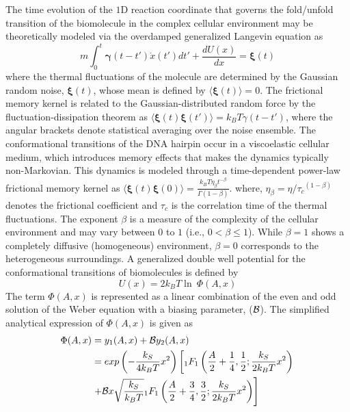 \documentclass[twoside,twocolumn,9pt]{article}
\begin{document}
The time evolution of the $1$D reaction coordinate that governs the fold/unfold transition of the biomolecule 
in the complex cellular environment may be theoretically modeled via the overdamped generalized Langevin equation
as \cite{zwanzig2001nonequilibrium,kubo2012statistical,sharma2021effect,sharma2020conformational,sharma2022analysis}
\begin{equation}
m \int_{0}^{t}\mathbf{\gamma}{(t-t')}{\dot{{{x}}}{(t')}} dt' + \frac{d {U}{(x)}}{dx} = \mathbf{\xi}{(t)}
\label{GLE}
\end{equation} 
where the thermal fluctuations of the molecule are determined by the Gaussian random noise, $\mathbf{\xi}{(t)}$,
whose mean is defined by $\langle\mathbf{\xi}{(t)}\rangle=0$. The frictional memory kernel is related to the 
Gaussian-distributed random force by the fluctuation-dissipation theorem \cite{kubo2012statistical} as 
$\langle\mathbf{\xi}{(t)}\mathbf{\xi}{(t')}\rangle=k_{B}T\gamma(t-t')$, where the angular brackets denote statistical
averaging over the noise ensemble. The conformational transitions of the DNA hairpin occur in a viscoelastic cellular 
medium, which introduces memory effects that makes the dynamics typically non-Markovian. This dynamics is modeled 
through a time-dependent power-law frictional memory kernel as 
$\langle\mathbf{\xi}{(t)}\mathbf{\xi}{(0)}\rangle=\frac{k_{B}T{\eta_\beta} t^{-\beta}}{\Gamma(1-\beta)}$.       
where, $\eta_{\beta}={\eta}/{{\tau_{c}}^{(1-\beta)}}$ denotes the frictional coefficient and 
$\tau_{c}$ is the correlation time of the thermal fluctuations. The exponent $\beta$ is a measure of the 
complexity of the cellular environment and may vary between $0$ to $1$ (i.e., $0 < \beta\leq 1$). While 
$\beta=1$ shows a completely diffusive (homogeneous) environment, $\beta=0$ corresponds to the heterogeneous 
surroundings. A generalized double well potential \cite{sharma2021effect,sharma2020conformational,hongler1983exact} 
for the conformational transitions of biomolecules is defined by
\begin{equation}
U(x)= 2 k_{B} T \ln \ \Phi(A,x)
\label{Asymm-poten-gen}
\end{equation}
The term $\Phi(A,x)$ is represented as a linear combination of the even and odd solution of the Weber 
equation \cite{hongler1983exact,sharma2021effect} with a biasing parameter, (${\cal{B}}$). The simplified analytical expression 
of $\Phi(A,x)$ is given as
\begin{equation}
\begin{split}
\Phi(A,x)&=y_{1}(A,x) + {\cal{B}} y_{2}(A,x)\\
	 &=exp\left(-\frac{k_{S}}{4 k_{B}T} x^{2}\right) \left[ {_1}F_{1} \left(\frac{A}{2}+\frac{1}{4},\frac{1}{2};\frac{k_{S}}{2k_{B}T} x^{2}\right) \right.\\
	 	&\left. +{\cal{B}} x \sqrt{\frac{k_{S}}{k_{B}T}}  {_1}F_{1} \left(\frac{A}{2}+\frac{3}{4},\frac{3}{2};\frac{k_{S}}{2k_{B}T} x^{2}\right) \right]
\label{Asymm-poten-expr}
\end{split} 
\end{equation}
\end{document}
